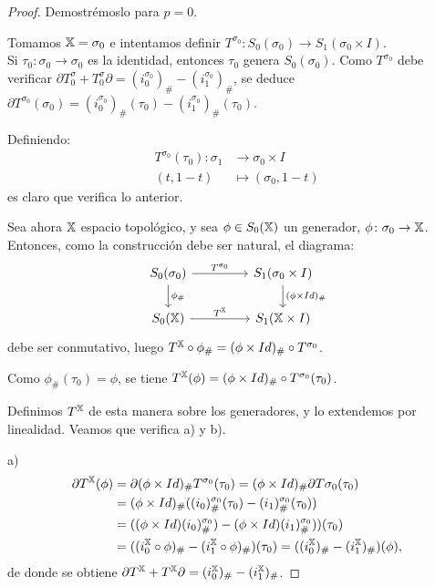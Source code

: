 \begin{proof}
  Demostrémoslo para $p = 0$.

  Tomamos ${\mathbb X} = \sigma_0$ e intentamos definir $T^{\sigma_0} \colon S_0(\sigma_0) \to S_1(\sigma_0 \times I)$. \\
  Si $\tau_0 \colon \sigma_0 \to \sigma_0$ es la identidad, entonces $\tau_0$ genera $S_0(\sigma_0)$. Como $T^{\sigma_0}$
  debe verificar $\partial T^\sigma_0 + T^\sigma_0 \partial = (i_0^{\sigma_0})_\# - (i_1^{\sigma_0})_\#$, se deduce
  $\partial T^{\sigma_0}(\sigma_0) = (i_0^{\sigma_0})_\# (\tau_0) - (i_1^{\sigma_0})_\# (\tau_0)$.

  Definiendo:
  \begin{align*}
    T^{\sigma_0}(\tau_0) \colon \sigma_1 &\to \sigma_0 \times I \\
                       (t, 1-t) &\mapsto (\sigma_0, 1-t)
  \end{align*}
  es claro que verifica lo anterior.

  Sea ahora ${\mathbb X}$ espacio topológico, y sea $\phi \in S_0({\mathbb X})$ un generador, $\phi \colon \sigma_0 \to {\mathbb X}$.
  Entonces, como la construcción debe ser natural, el diagrama:
  \[
  \begin{tikzcd}
    S_0(\sigma_0) \arrow{r}{T^{\sigma_0}} \arrow{d}{\phi_\#} & [2em] S_1(\sigma_0 \times I) \arrow{d}{(\phi \times Id)_\#} \\
    \SX{0} \arrow{r}{T^\X}                 & S_1(\X \times I)
  \end{tikzcd}
  \]
  debe ser conmutativo, luego $T^{\mathbb X} \circ \phi_\# = (\phi \times Id)_\# \circ T^{\sigma_0}$.

  Como $\phi_\#(\tau_0) = \phi$, se tiene $T^{\mathbb X}(\phi) = (\phi \times Id)_\# \circ T^{\sigma_0}(\tau_0)$.

  Definimos $T^{\mathbb X}$ de esta manera sobre los generadores, y lo extendemos por linealidad. Veamos que verifica a) y b).

  a)
  \begin{align*}
    \partial T^{\mathbb X}(\phi) &= \partial(\phi \times Id)_\# T^{\sigma_0}(\tau_0) = (\phi \times Id)_\# \partial T{ \sigma_0}(\tau_0) \\
                        &= (\phi \times Id)_\# ((i_0)_\#^{\sigma_0}(\tau_0) - (i_1)_\#^{\sigma_0}(\tau_0)) \\
                        &= ((\phi \times Id) (i_0)_\#^{\sigma_0}) - (\phi \times Id) (i_1)_\#^{\sigma_0}))(\tau_0) \\
                        &= ((i_0^{\mathbb X} \circ \phi)_\# - (i_1^{\mathbb X} \circ \phi)_\#) (\tau_0) = ((i_0^{\mathbb X})_\# - (i_1^{\mathbb X})_\#)(\phi),
  \end{align*}
  de donde se obtiene $\partial T^{\mathbb X} + T^{\mathbb X} \partial = (i_0^{\mathbb X})_\# - (i_1^{\mathbb X})_\#$.


\end{proof}
